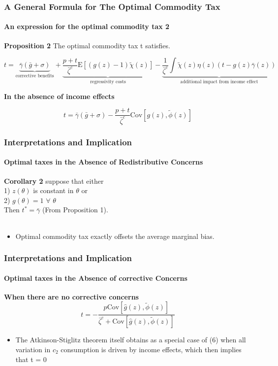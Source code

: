 \documentclass{beamer}
\newcommand{\Cov}{\mathrm{Cov}}
\newcommand{\E}{\mathrm{E}}
\begin{document}
\begin{frame}[shrink=6]
\frametitle{A General Formula for The Optimal Commodity Tax}
\framesubtitle{An expression for the optimal commodity tax 2}

\textbf{Proposition 2} The optimal commodity tax t satisfies. 

$$ t = \underbrace{ \bar{\gamma}(\bar{g} + \sigma)}_\text{corrective benefits} + 
\underbrace{ \frac{p + t}{\bar{\zeta}^c} \E[(g(z)-1) \tilde{\chi}(z)] }_\text{regressivity costs}  - 
\underbrace{ \frac{1}{\bar{\zeta}^c} \int \tilde{\chi}(z) \eta (z) (t-g(z) \bar{\gamma}(z))}_\text{additional impact from income effect}$$

\textbf{In the absence of income effects} 

$$ t = \bar{\gamma}(\bar{g} + \sigma) -  \frac{p + t}{\bar{\zeta}^c} \Cov \left[ g(z), \tilde{\phi}(z)  \right] $$
	 
\end{frame}







\begin{frame}
\frametitle{Interpretations and Implication}
\framesubtitle{Optimal taxes in the Absence of Redistributive Concerns}

\textbf{Corollary 2} suppose that either\\
 1) $z(\theta)$ is constant in $\theta$ or\\
  2) $g(\theta) = 1$ $\forall$ $\theta$ \\
  Then $t^* = \bar{\gamma}$ (From Proposition 1). \\~\\

\begin{itemize}
\item Optimal commodity tax exactly offsets the average marginal bias. 
\end{itemize}

\end{frame}



\begin{frame}
\frametitle{Interpretations and Implication}
\framesubtitle{Optimal taxes in the Absence of corrective Concerns}

\textbf{When there are no corrective concerns}
$$ t = -\frac{p\Cov \left[ \hat{g}(z),\tilde{\phi}(z) \right]}{\bar{\zeta}^c + \Cov \left[\hat{g}(z), \tilde{\phi}(z) \right]} $$ 

\begin{itemize}
\item The Atkinson-Stiglitz theorem itself obtains as a special case of (6) when all variation
in $c_2$ consumption is driven by income effects, which then implies that t = 0
\end{itemize}
\end{frame}
\end{document}
